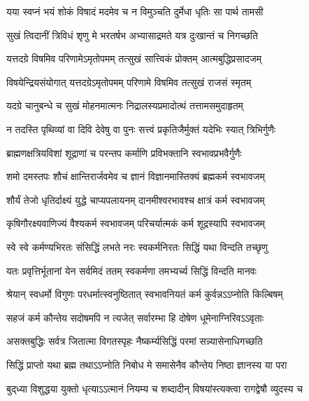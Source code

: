 \twolineshloka
{यया स्वप्नं भयं शोकं विषादं मदमेव च}
{न विमुञ्चति दुर्मेधा धृतिः सा पार्थ तामसी}%

\twolineshloka
{सुखं त्विदानीं त्रिविधं शृणु मे भरतर्षभ}
{अभ्यासाद्रमते यत्र दुःखान्तं च निगच्छति}%

\twolineshloka
{यत्तदग्रे विषमिव परिणामेऽमृतोपमम्}
{तत्सुखं सात्त्विकं प्रोक्तम् आत्मबुद्धिप्रसादजम्}%

\twolineshloka
{विषयेन्द्रियसंयोगात् यत्तदग्रेऽमृतोपमम्}
{परिणामे विषमिव तत्सुखं राजसं स्मृतम्}%

\twolineshloka
{यदग्रे चानुबन्धे च सुखं मोहनमात्मनः}
{निद्रालस्यप्रमादोत्थं तत्तामसमुदाहृतम्}%

\twolineshloka
{न तदस्ति पृथिव्यां वा दिवि देवेषु वा पुनः}
{सत्त्वं प्रकृतिजैर्मुक्तं यदेभिः स्यात् त्रिभिर्गुणैः}%

\twolineshloka
{ब्राह्मणक्षत्रियविशां शूद्राणां च परन्तप}
{कर्माणि प्रविभक्तानि स्वभावप्रभवैर्गुणैः}%

\twolineshloka
{शमो दमस्तपः शौचं क्षान्तिरार्जवमेव च}
{ज्ञानं विज्ञानमास्तिक्यं ब्रह्मकर्म स्वभावजम्}%

\twolineshloka
{शौर्यं तेजो धृतिर्दाक्ष्यं युद्धे चाप्यपलायनम्}
{दानमीश्वरभावश्च क्षात्रं कर्म स्वभावजम्}%

\twolineshloka
{कृषिगौरक्ष्यवाणिज्यं वैश्यकर्म स्वभावजम्}
{परिचर्यात्मकं कर्म शूद्रस्यापि स्वभावजम्}%

\twolineshloka
{स्वे स्वे कर्मण्यभिरतः संसिद्धिं लभते नरः}
{स्वकर्मनिरतः सिद्धिं यथा विन्दति तच्छृणु}%

\twolineshloka
{यतः प्रवृत्तिर्भूतानां येन सर्वमिदं ततम्}
{स्वकर्मणा तमभ्यर्च्य सिद्धिं विन्दति मानवः}%

\twolineshloka
{श्रेयान् स्वधर्मो विगुणः परधर्मात्स्वनुष्ठितात्}
{स्वभावनियतं कर्म कुर्वन्नऽऽप्नोति किल्बिषम्}%

\twolineshloka
{सहजं कर्म कौन्तेय सदोषमपि न त्यजेत्}
{सर्वारम्भा हि दोषेण धूमेनाग्निरिवऽऽवृताः}%

\twolineshloka
{असक्तबुद्धिः सर्वत्र जितात्मा विगतस्पृहः}
{नैष्कर्म्यसिद्धिं परमां सन्न्यासेनाधिगच्छति}%

\twolineshloka
{सिद्धिं प्राप्तो यथा ब्रह्म तथाऽऽप्नोति निबोध मे}
{समासेनैव कौन्तेय निष्ठा ज्ञानस्य या परा}%

\twolineshloka
{बुद्‌ध्या विशुद्धया युक्तो धृत्याऽऽत्मानं नियम्य च}
{शब्दादीन् विषयांस्त्यक्त्वा रागद्वेषौ व्युदस्य च}%

